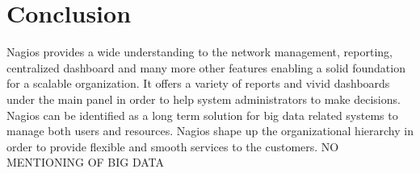 \documentclass[9pt,twocolumn,twoside]{styles/osajnl}
\begin{document}
\section{Conclusion}

Nagios provides a wide understanding to the network management, reporting,
centralized dashboard and many more other features enabling a solid
foundation for a scalable organization. It offers a variety of
reports and vivid dashboards under the main panel in order to help
system administrators to make decisions. Nagios can be identified as a long
term solution for big data related systems to manage both users and resources.
Nagios shape up the organizational hierarchy in order to provide flexible
and smooth services to the customers. NO MENTIONING OF BIG DATA



 
\end{document}
